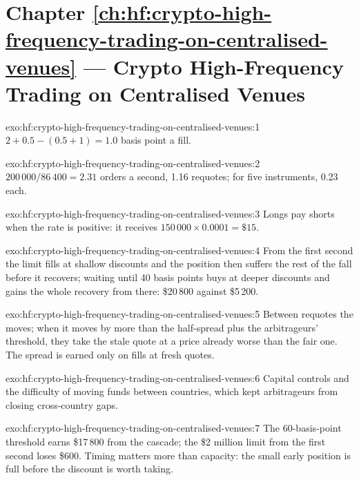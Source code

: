 \section*{Chapter \ref{ch:hf:crypto-high-frequency-trading-on-centralised-venues} --- Crypto High-Frequency Trading on Centralised Venues}

\begin{solution}{exo:hf:crypto-high-frequency-trading-on-centralised-venues:1}
$2+0.5-(0.5+1)=1.0$ basis point a fill.
\end{solution}

\begin{solution}{exo:hf:crypto-high-frequency-trading-on-centralised-venues:2}
$200\,000/86\,400=2.31$ orders a second, 1.16 requotes; for five instruments, 0.23 each.
\end{solution}

\begin{solution}{exo:hf:crypto-high-frequency-trading-on-centralised-venues:3}
Longs pay shorts when the rate is positive: it receives $150\,000\times0.0001=\$15$.
\end{solution}

\begin{solution}{exo:hf:crypto-high-frequency-trading-on-centralised-venues:4}
From the first second the limit fills at shallow discounts and the position then suffers the rest of the fall before it recovers; waiting until 40
basis points buys at deeper discounts and gains the whole recovery from there: \$20\,800 against \$5\,200.
\end{solution}

\begin{solution}{exo:hf:crypto-high-frequency-trading-on-centralised-venues:5}
Between requotes the  moves; when it moves by more than the half-spread plus the arbitrageurs' threshold, they take the stale quote at a
price already worse than the fair one. The spread is earned only on fills at fresh quotes.
\end{solution}

\begin{solution}{exo:hf:crypto-high-frequency-trading-on-centralised-venues:6}
Capital controls and the difficulty of moving funds between countries, which kept arbitrageurs from closing cross-country gaps.
\end{solution}

\begin{solution}{exo:hf:crypto-high-frequency-trading-on-centralised-venues:7}
The 60-basis-point threshold earns \$17\,800 from the cascade; the \$2 million limit from the first second loses \$600. Timing matters more than
capacity: the small early position is full before the discount is worth taking.
\end{solution}

